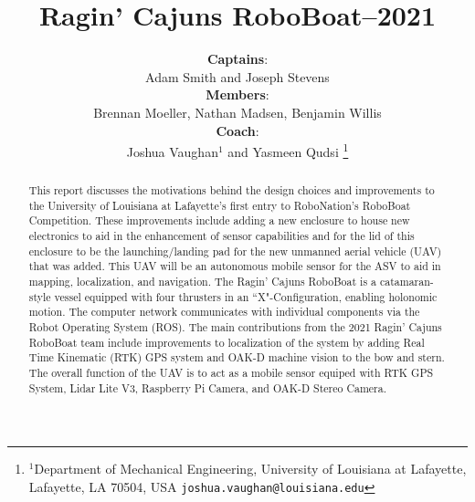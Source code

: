 \documentclass[letterpaper, 12 pt, conference]{ieeeconf}
\title{\LARGE \bf Ragin' Cajuns RoboBoat--2021}
\author{\textbf{Captains}:\\Adam Smith and Joseph Stevens \\
\textbf{Members}:\\Brennan Moeller, Nathan Madsen, Benjamin Willis\\
\textbf{Coach}:\\Joshua Vaughan$^{1}$ and Yasmeen Qudsi%
\thanks{$^{1}$Department of Mechanical Engineering,
        University of Louisiana at Lafayette, Lafayette, LA 70504, USA
        {\tt\small joshua.vaughan@louisiana.edu}}%
}
\begin{document}
\maketitle
\thispagestyle{fancyplain}
\begin{abstract}
This report discusses the motivations behind the design choices and improvements to the University of Louisiana at Lafayette's first entry to RoboNation's RoboBoat Competition. These improvements include adding a new enclosure to house new electronics to aid in the enhancement of sensor capabilities and for the lid of this enclosure to be the launching/landing pad for the new unmanned aerial vehicle (UAV) that was added. This UAV will be an autonomous mobile sensor for the ASV to aid in mapping, localization, and navigation. The Ragin' Cajuns RoboBoat is a catamaran-style vessel equipped with four thrusters in an ``X"-Configuration, enabling holonomic motion. The computer network communicates with individual components via the Robot Operating System (ROS). The main contributions from the 2021 Ragin' Cajuns RoboBoat team include improvements to localization of the system  by adding Real Time Kinematic (RTK) GPS system and OAK-D machine vision to the bow and stern. The overall function of the UAV is to act as a mobile sensor equiped with RTK GPS System, Lidar Lite V3, Raspberry Pi Camera, and OAK-D Stereo Camera. 
\end{abstract}
\end{document}
